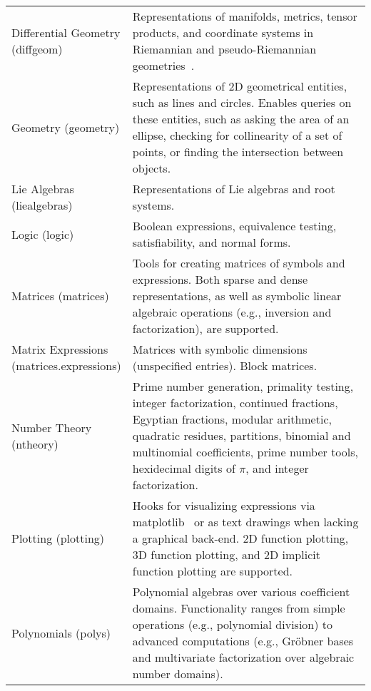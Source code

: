 \begin{longtable}[htbc]{p{0.3\linewidth}p{0.7\linewidth}}
Differential Geometry (diffgeom) & Representations of manifolds, metrics, tensor
products, and coordinate systems in Riemannian and pseudo-Riemannian
geometries~\cite{FunctionalDifferentialGeometry}.\\

Geometry (geometry) & Representations of 2D geometrical entities, such as lines and
circles. Enables queries on these entities, such as asking the area of an
ellipse, checking for collinearity of a set of
points, or finding the intersection between objects.\\

Lie Algebras (liealgebras) & Representations of Lie algebras and root systems.\\

Logic (logic) & Boolean expressions, equivalence testing, satisfiability, and normal
forms.\\

Matrices (matrices) & Tools for creating matrices of symbols and expressions.
Both sparse and dense representations, as well as symbolic linear
algebraic operations (e.g., inversion and factorization), are
supported.\\

Matrix Expressions (matrices.expressions) & Matrices with symbolic dimensions (unspecified entries).
Block matrices.\\

Number Theory (ntheory) & Prime number generation, primality testing, integer
factorization, continued fractions, Egyptian fractions, modular arithmetic,
quadratic residues, partitions, binomial and multinomial coefficients,
prime number tools, hexidecimal digits of $\pi$, and integer factorization. \\

Plotting (plotting) & Hooks for visualizing expressions via matplotlib~\cite{Hunter:2007}
or as text drawings when lacking a graphical back-end. 2D function plotting,
3D function
plotting, and 2D implicit function plotting are supported.\\

Polynomials (polys) & Polynomial algebras over various coefficient domains.
Functionality ranges from simple operations (e.g., polynomial division) to
advanced computations (e.g., Gr\"obner bases~\cite{adams1994introduction} and multivariate
factorization over algebraic number domains).\\


\end{longtable}
